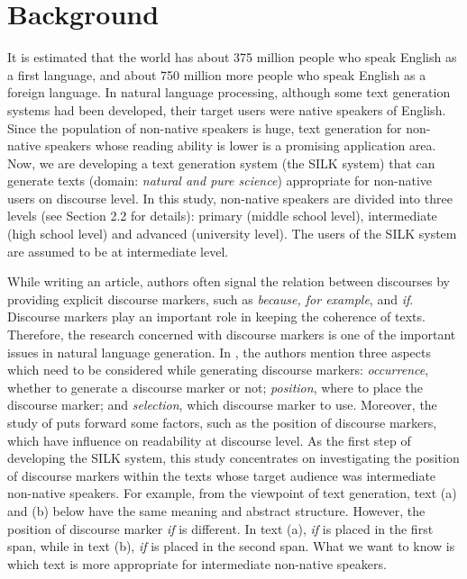 \documentclass[english]{jnlp_1.3e}
\begin{document}
\maketitle


\section{Background} 

It is estimated that the world has about 375 million people who speak
English as a first language, and about 750 million more people
who speak English as a foreign language. In natural language processing, 
although some text generation systems \cite{McKeown85,Goldberg94,Bateman97} 
had been developed, their target users were native speakers of English. 
Since the population of non-native speakers is huge, text generation
for non-native speakers whose reading ability is lower is a promising 
application area. Now, we are developing a text generation system
(the SILK system) that can generate texts (domain: \textit{natural and pure science})
appropriate for non-native users on discourse level. In this study, non-native
speakers are divided into three levels (see Section 2.2 for details): primary
(middle school level), intermediate (high school level) and advanced (university level).
The users of the SILK system are assumed to be at intermediate level. 

While writing an article, authors often signal the relation between 
discourses by providing explicit discourse markers, such as 
\textit{because, for example}, and \textit{if}. Discourse markers
play an important role in keeping the coherence of texts. 
Therefore, the research concerned with discourse 
markers is one of the important issues in natural language generation. 
In \cite{Eugenio97}, the authors mention three aspects which need to be 
considered while generating discourse markers: 
\textit{occurrence}, whether to generate a discourse marker or not; 
\textit{position}, where to place the discourse marker; 
and \textit{selection}, which discourse marker to use. Moreover, 
the study of \cite{Will04} puts forward some factors, 
such as the position of discourse markers, which have influence on readability
at discourse level. As the first step of developing the SILK system, 
this study concentrates on investigating the position of discourse markers 
within the texts whose target audience was intermediate non-native 
speakers. For example, from the viewpoint of text generation, text (a) and
(b) below have the same meaning and abstract structure. However, 
the position of discourse marker \textit{if} is different. In text (a), 
\textit{if} is placed in the first span, while in text (b), \textit{if}
is placed in the second span. What we want to know is which text 
is more appropriate for intermediate non-native speakers.
\end{document}
